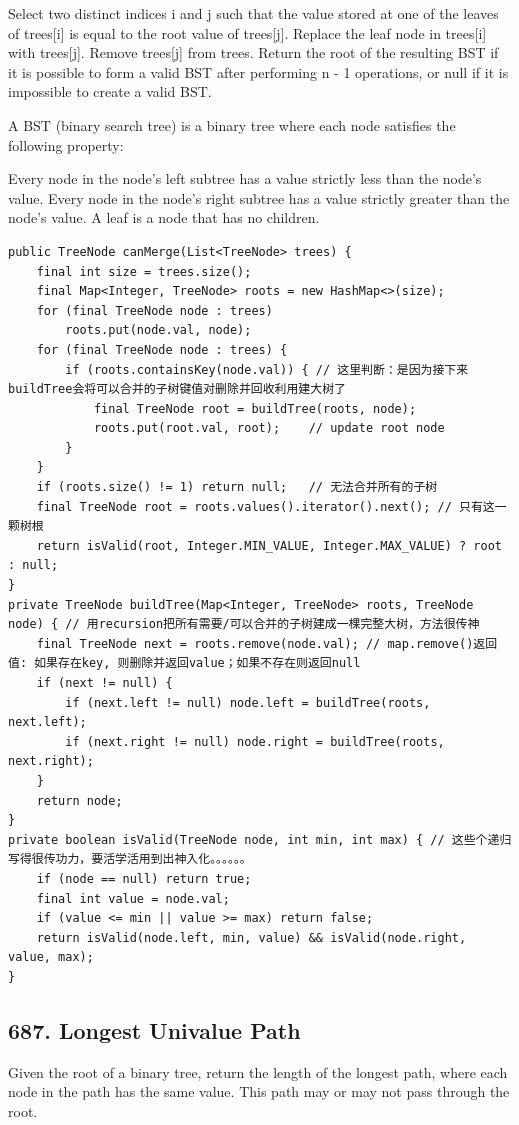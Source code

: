 \documentclass[9pt, b5paaper]{book}
\begin{document}
Select two distinct indices i and j such that the value stored at one of the leaves of trees[i] is equal to the root value of trees[j].
Replace the leaf node in trees[i] with trees[j].
Remove trees[j] from trees.
Return the root of the resulting BST if it is possible to form a valid BST after performing n - 1 operations, or null if it is impossible to create a valid BST.

A BST (binary search tree) is a binary tree where each node satisfies the following property:

Every node in the node's left subtree has a value strictly less than the node's value.
Every node in the node's right subtree has a value strictly greater than the node's value.
A leaf is a node that has no children.
\begin{verbatim}
public TreeNode canMerge(List<TreeNode> trees) {
    final int size = trees.size();
    final Map<Integer, TreeNode> roots = new HashMap<>(size);
    for (final TreeNode node : trees) 
        roots.put(node.val, node);
    for (final TreeNode node : trees) {
        if (roots.containsKey(node.val)) { // 这里判断：是因为接下来buildTree会将可以合并的子树键值对删除并回收利用建大树了
            final TreeNode root = buildTree(roots, node);
            roots.put(root.val, root);    // update root node
        }
    }
    if (roots.size() != 1) return null;   // 无法合并所有的子树
    final TreeNode root = roots.values().iterator().next(); // 只有这一颗树根
    return isValid(root, Integer.MIN_VALUE, Integer.MAX_VALUE) ? root : null;
}
private TreeNode buildTree(Map<Integer, TreeNode> roots, TreeNode node) { // 用recursion把所有需要/可以合并的子树建成一棵完整大树，方法很传神
    final TreeNode next = roots.remove(node.val); // map.remove()返回值: 如果存在key, 则删除并返回value；如果不存在则返回null
    if (next != null) {
        if (next.left != null) node.left = buildTree(roots, next.left);
        if (next.right != null) node.right = buildTree(roots, next.right);
    }
    return node;
}
private boolean isValid(TreeNode node, int min, int max) { // 这些个递归写得很传功力，要活学活用到出神入化。。。。。。
    if (node == null) return true;
    final int value = node.val;
    if (value <= min || value >= max) return false;
    return isValid(node.left, min, value) && isValid(node.right, value, max);
}
\end{verbatim}

\subsection{687. Longest Univalue Path}
\label{sec-3-0-6}
Given the root of a binary tree, return the length of the longest path, where each node in the path has the same value. This path may or may not pass through the root.
\end{document}
